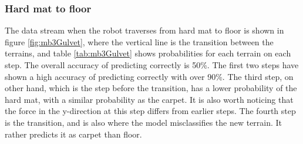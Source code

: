 \documentclass[USenglish]{ifimaster}  %
\begin{document}
	
	\begin{table}[h]
		\centering
		\caption[Results of transistion from floor to carpet]{Estimated probability of each terrain per step from floor to carpet. Values are marked green to represent correct predictions. For incorrect predictions, the actual value is marked yellow while the predicted value is marked red.}
		\label{tab:Gulvet4teppe}
	\end{table}
	\FloatBarrier
	\clearpage
	
\subsubsection{Hard mat to floor} \label{subsec:hmf}
The data stream when the robot traverses from hard mat to floor is shown in figure \ref{fig:mb3Gulvet}, where the vertical line is the transition between the terrains, and table \ref{tab:mb3Gulvet} shows probabilities for each terrain on each step. The overall accuracy of predicting correctly is 50\%. The first two steps have shown a high accuracy of predicting correctly with over 90\%. The third step, on other hand, which is the step before the transition, has a lower probability of the hard mat, with a similar probability as the carpet. It is also worth noticing that the force in the y-direction at this step differs from earlier steps. The fourth step is the transition, and is also where the model misclassifies the new terrain. It rather predicts it as carpet than floor.
		
\end{document}
